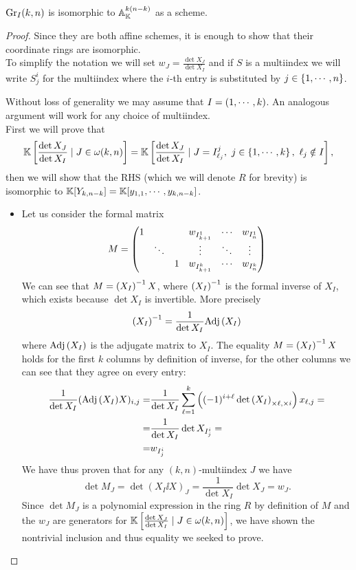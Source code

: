\begin{proposition}\label{GrassmannianIsCoveredByAffineSpaces}
$\mathrm{Gr}_I(k,n)$ is isomorphic to $\mathbb{A}^{k(n-k)}_{\mathbb{K}}$ as a scheme.
\end{proposition}
\begin{proof}
Since they are both affine schemes, it is enough to show that their coordinate rings are isomorphic.\\
To simplify the notation we will set $w_J=\frac{\det X_J}{\det X_I}$ and if $S$ is a multiindex we will write $S^i_j$ for the multiindex where the $i$-th entry is substituted by $j\in\left\{{1,\cdots, n}\right\}$.
\medskip

\noindent Without loss of generality we may assume that $I=\left({1,\cdots, k}\right)$. An analogous argument will work for any choice of multiindex.\\
First we will prove that
\[\mathbb{K}\left[{\frac{\det X_J}{\det X_I}\mid J\in \omega(k,n)}\right]=\mathbb{K}\left[{\frac{\det X_J}{\det X_I}\mid J=I^j_{\ell_j},\ j\in \left\{{1,\cdots, k}\right\},\ \ell_j\notin I}\right],\]
then we will show that the RHS (which we will denote $R$ for brevity) is isomorphic to $\mathbb{K}[Y_{k,n-k}]=\mathbb{K}[y_{1,1},\cdots, y_{k,n-k}]$.
\setlength{\leftmargini}{0cm}
\begin{itemize}
\item Let us consider the formal matrix
\[M=\begin{pmatrix}
1 &        &   & w_{I^1_{k+1}} & \cdots & w_{I^1_n}\\
  & \ddots &   & \vdots        & \ddots & \vdots\\
  &        & 1 & w_{I^k_{k+1}} & \cdots & w_{I^k_n}
\end{pmatrix}\]
We can see that $M=\left({X_I}\right)^{-1} X$, where $\left({X_I}\right)^{-1}$ is the formal inverse of $X_I$, which exists because $\det X_I$ is invertible. More precisely
\[\left({X_I}\right)^{-1}=\frac1{\det X_I}\mathrm{Adj}\,(X_I)\]
where $\mathrm{Adj}\,(X_I)$ is the adjugate matrix to $X_I$. The equality $M=\left({X_I}\right)^{-1} X$ holds for the first $k$ columns by definition of inverse, for the other columns we can see that they agree on every entry:
\begin{align*}
\frac1{\det X_I}(\mathrm{Adj}\,(X_I) X)_{i,j}=&\frac1{\det X_I}\sum_{\ell=1}^k\left({(-1)^{i+\ell} \det \left({X_I}\right)_{\times \ell,\times i}}\right)x_{\ell,j}=\\
=&\frac1{\det X_I}\det X_{I^i_j}=\\
=&w_{I^i_j}
\end{align*}
We have thus proven that for any $(k,n)$-multiindex $J$ we have
\[\det M_J=\det (X_I\ii X)_J=\frac1{\det X_I}\det X_J=w_J.\]
Since $\det M_J$ is a polynomial expression in the ring $R$ by definition of $M$ and the $w_J$ are generators for $\mathbb{K}\left[{\frac{\det X_J}{\det X_I}\mid J\in \omega(k,n)}\right]$, we have shown the nontrivial inclusion and thus equality we seeked to prove.

\end{itemize}
\end{proof}
